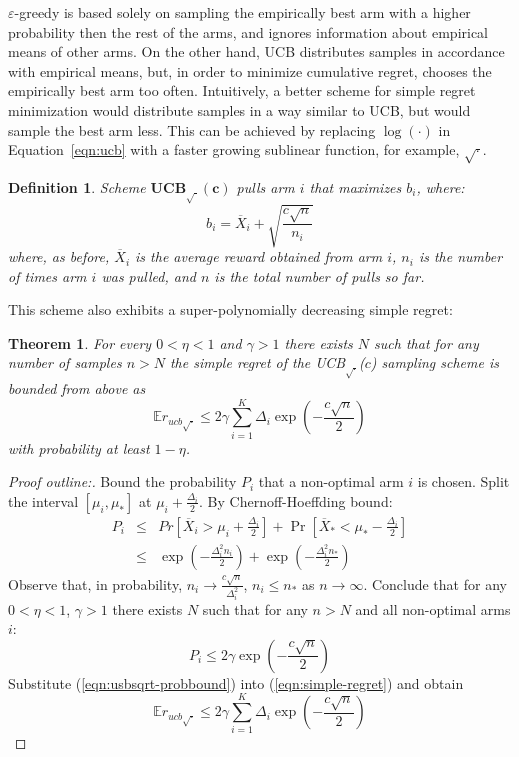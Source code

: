 \documentclass[letterpaper]{article}
\newcommand {\IE} {\ensuremath {\mathbb{E}}}
\newtheorem{dfn}{Definition}
\newtheorem{thm}{Theorem}
\begin{document}
$\varepsilon$-greedy is based solely on sampling the empirically best
arm with a higher probability then the rest of the arms, and ignores
information about empirical means of other arms. On the other hand,
UCB distributes samples in accordance with empirical means, but, in order to
minimize cumulative regret, chooses the empirically best arm too often.
Intuitively, a better scheme for simple regret minimization would
distribute samples in a way similar to UCB, but would sample the best arm
less. This can be achieved by replacing $\log(\cdot)$ in
Equation~\ref{eqn:ucb} with a faster growing sublinear function, for
example, $\sqrt\cdot$.
\begin{dfn} Scheme $\mathbf{UCB_{\sqrt{\cdot}}(c)}$ pulls arm $i$ that
maximizes $b_i$, where:
\begin{equation}
b_i=\overline X_i+\sqrt {\frac {c \sqrt n} {n_i}}
\end{equation}
where, as before, $\overline X_i$ is the average reward obtained from arm $i$,
$n_i$ is the number of times arm $i$ was pulled, and $n$ is the total
number of pulls so far. \end{dfn}
This scheme also exhibits a super-polynomially decreasing simple regret:
\begin{thm}  For every $0<\eta<1$  and $\gamma>1$ there exists $N$ such that for
  any number of samples $n>N$ the simple regret of the  UCB$_{\sqrt{\cdot}}$($c$)
sampling scheme is  bounded from above as
\begin{equation}
\IE r_{ucb\sqrt{\cdot}} \le
2\gamma\sum_{i=1}^K\Delta_i\exp\left(-\frac {c\sqrt{n}} 2\right)
\end{equation}
with probability at least $1-\eta$.
\end{thm}

\begin{proof}[Proof outline:] Bound the probability $P_i$ that a
  non-optimal arm $i$ is chosen. Split the interval $[\mu_i, \mu_*]$
  at $\mu_i+\frac {\Delta_i} 2$. By Chernoff-Hoeffding bound:
\begin{eqnarray}
P_i&\le&Pr\left[\overline X_i>\mu_i+\frac {\Delta_i} 2\right]+\Pr\left[\overline X_*<\mu_*-\frac {\Delta_i}
  2\right]\nonumber \\
   &\le&\exp\left(-\frac {\Delta_i^2n_i} 2\right)+\exp\left(-\frac {\Delta_i^2n_*} 2\right)
\end{eqnarray}
Observe that, in probability, $n_i\to \frac {c \sqrt n}
{\Delta_i^2}$, $n_i\le n_*$ as $n\to\infty$. Conclude that for
any $0<\eta<1$, $\gamma>1$ there exists $N$ such that for any $n>N$ and
all non-optimal arms $i$:
\begin{equation}
P_i \le 2\gamma \exp\left(-\frac {c \sqrt n} 2\right)
\label{eqn:usbsqrt-probbound}
\end{equation}
Substitute (\ref{eqn:usbsqrt-probbound}) into
(\ref{eqn:simple-regret}) and obtain
\begin{equation}
\IE r_{ucb\sqrt{\cdot}} \le 2\gamma\sum_{i=1}^K\Delta_i\exp\left(-\frac {c\sqrt{n}} 2\right)
\end{equation}
\end{proof}
\end{document}
